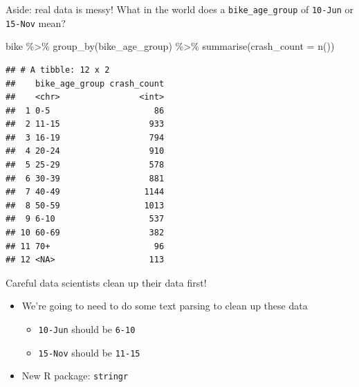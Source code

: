 \documentclass[
  ignorenonframetext,
]{beamer}
\newenvironment{Shaded}{\begin{snugshade}}{\end{snugshade}}
\newcommand{\AttributeTok}[1]{\textcolor[rgb]{0.77,0.63,0.00}{#1}}
\newcommand{\FunctionTok}[1]{\textcolor[rgb]{0.00,0.00,0.00}{#1}}
\newcommand{\NormalTok}[1]{#1}
\newcommand{\SpecialCharTok}[1]{\textcolor[rgb]{0.00,0.00,0.00}{#1}}
\providecommand{\tightlist}{%
  \setlength{\itemsep}{0pt}\setlength{\parskip}{0pt}}
\begin{document}
\begin{frame}[fragile]{Aside: real data is messy!}
\protect\hypertarget{aside-real-data-is-messy}{}
What in the world does a \texttt{bike\_age\_group} of \texttt{10-Jun} or
\texttt{15-Nov} mean?

\begin{Shaded}
\begin{Highlighting}[]
\NormalTok{bike }\SpecialCharTok{\%\textgreater{}\%}
  \FunctionTok{group\_by}\NormalTok{(bike\_age\_group) }\SpecialCharTok{\%\textgreater{}\%}
  \FunctionTok{summarise}\NormalTok{(}\AttributeTok{crash\_count =} \FunctionTok{n}\NormalTok{())}
\end{Highlighting}
\end{Shaded}

\begin{verbatim}
## # A tibble: 12 x 2
##    bike_age_group crash_count
##    <chr>                <int>
##  1 0-5                     86
##  2 11-15                  933
##  3 16-19                  794
##  4 20-24                  910
##  5 25-29                  578
##  6 30-39                  881
##  7 40-49                 1144
##  8 50-59                 1013
##  9 6-10                   537
## 10 60-69                  382
## 11 70+                     96
## 12 <NA>                   113
\end{verbatim}
\end{frame}

\begin{frame}[fragile]{Careful data scientists clean up their data
first!}
\protect\hypertarget{careful-data-scientists-clean-up-their-data-first}{}
\begin{itemize}
\tightlist
\item
  We're going to need to do some text parsing to clean up these data

  \begin{itemize}
  \tightlist
  \item
    \texttt{10-Jun} should be \texttt{6-10}
  \item
    \texttt{15-Nov} should be \texttt{11-15}
  \end{itemize}
\item
  New R package: \texttt{stringr}
\end{itemize}
\end{frame}
\end{document}
